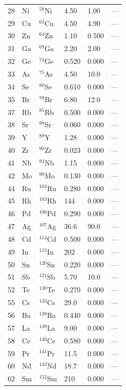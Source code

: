 \documentclass[12pt,a4paper]{article}
\begin{document}
\begin{longtable}{p{0.8cm}p{1.2cm}p{2.0cm}p{2.5cm}p{2.5cm}p{2.5cm}}
		28 & Ni & \(^{58}\)Ni & 4.50 & 1.00 & --- \\
		29 & Cu & \(^{63}\)Cu & 4.50 & 4.90 & --- \\
		30 & Zn & \(^{64}\)Zn & 1.10 & 0.500 & --- \\
		31 & Ga & \(^{69}\)Ga & 2.20 & 2.00 & --- \\
		32 & Ge & \(^{74}\)Ge & 0.520 & 0.000 & --- \\
		33 & As & \(^{75}\)As & 4.50 & 10.0 & --- \\
		34 & Se & \(^{80}\)Se & 0.610 & 0.000 & --- \\
		35 & Br & \(^{79}\)Br & 6.80 & 12.0 & --- \\
		37 & Rb & \(^{85}\)Rb & 0.500 & 0.000 & --- \\
		38 & Sr & \(^{88}\)Sr & 0.060 & 0.000 & --- \\
		39 & Y  & \(^{89}\)Y & 1.28 & 0.000 & --- \\
		40 & Zr & \(^{90}\)Zr & 0.023 & 0.000 & --- \\
		41 & Nb & \(^{93}\)Nb & 1.15 & 0.000 & --- \\
		42 & Mo & \(^{98}\)Mo & 0.130 & 0.000 & --- \\
		44 & Ru & \(^{102}\)Ru & 0.280 & 0.000 & --- \\
		45 & Rh & \(^{103}\)Rh & 144 & 0.000 & --- \\
		46 & Pd & \(^{106}\)Pd & 0.290 & 0.000 & --- \\
		47 & Ag & \(^{107}\)Ag & 36.6 & 90.0 & --- \\
		48 & Cd & \(^{114}\)Cd & 0.500 & 0.000 & --- \\
		49 & In & \(^{115}\)In & 202 & 0.000 & --- \\
		50 & Sn & \(^{120}\)Sn & 0.220 & 0.000 & --- \\
		51 & Sb & \(^{121}\)Sb & 5.70 & 10.0 & --- \\
		52 & Te & \(^{130}\)Te & 0.270 & 0.000 & --- \\
		55 & Cs & \(^{133}\)Cs & 29.0 & 0.000 & --- \\
		56 & Ba & \(^{138}\)Ba & 0.440 & 0.000 & --- \\
		57 & La & \(^{139}\)La & 9.00 & 0.000 & --- \\
		58 & Ce & \(^{140}\)Ce & 0.580 & 0.000 & --- \\
		59 & Pr & \(^{141}\)Pr & 11.5 & 0.000 & --- \\
		60 & Nd & \(^{142}\)Nd & 18.7 & 0.000 & --- \\
		62 & Sm & \(^{152}\)Sm & 210 & 0.000 & --- \\

\end{longtable}
\end{document}
